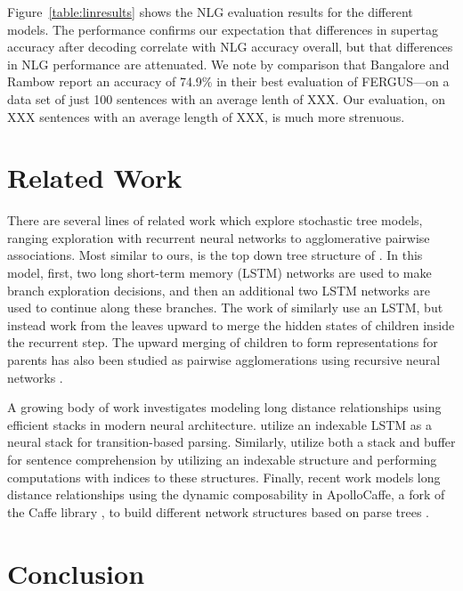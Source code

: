 \documentclass[11pt]{article}
\begin{document}
Figure~\ref{table:linresults} shows the NLG evaluation results for the
different models.
%
The performance confirms our expectation that differences in supertag
accuracy after decoding correlate with NLG accuracy overall, but that
differences in NLG performance are attenuated.
%
We note by comparison that Bangalore and Rambow report an accuracy of
74.9\% in their best evaluation of FERGUS---on a data set of just 100
sentences with an average lenth of XXX.
%
Our evaluation, on XXX sentences with an average length of XXX, is much
more strenuous.

\section{Related Work}
\label{sec:relatedwork}

There are several lines of related work which explore stochastic tree models, ranging exploration with recurrent neural networks to agglomerative pairwise associations. 
%
Most similar to ours, is the top down tree structure of .
%
In this model, first, two long short-term memory (LSTM) networks are used to make branch exploration decisions, and then an additional two LSTM networks are used to continue along these branches. 
%
The work of  similarly use an LSTM, but instead work from the leaves upward to merge the hidden states of children inside the recurrent step. 
%
The upward merging of children to form representations for parents has also been studied as pairwise agglomerations using recursive neural networks \cite{Socher2010}.

A growing body of work investigates modeling long distance relationships using efficient stacks in modern neural architecture. 
%
 utilize an indexable LSTM as a neural stack for transition-based parsing.  
%
Similarly,  utilize both a stack and buffer for sentence comprehension by utilizing an indexable structure and performing computations with indices to these structures. 
%
Finally, recent work models long distance relationships using the dynamic composability in ApolloCaffe, a fork of the Caffe library \cite{jia2014caffe}, to build different network structures based on parse trees \cite{Andreas2016LearningTC}.

\section{Conclusion}
\label{sec:conclusion}
\end{document}
